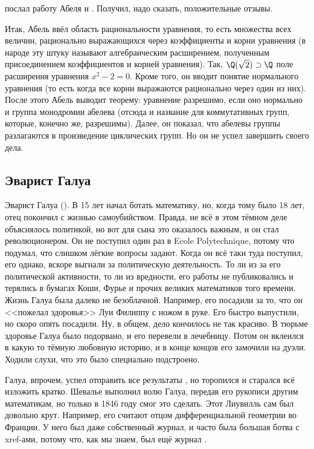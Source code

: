 \documentclass[a4paper,oneside,fleqn,10pt]{article}
\begin{document}
 послал работу Абеля  и .
Получил, надо сказать, положительные отзывы.

Итак, Абель ввёл область рациональности уравнения, то есть множества всех величин, рационально
выражающихся через коэффициенты и корни уравнения (в народе эту штуку называют алгебраическим
расширением, полученным присоединением коэффициентов и корней уравнения).
Так, $\Q(\sqrt2) \supset \Q$ поле расширения уравнения $x^2 -2=0$.
Кроме того, он вводит понятие нормального уравнения (то есть когда все корни выражаются
рационально через один из них). После этого Абель выводит теорему:
уравнение разрешимо, если оно нормально и группа монодромии абелева (отсюда и название
для коммутативных групп, которые, конечно же, разрешимы).
Далее, он показал, что абелевы группы разлагаются в произведение циклических групп.
Но он не успел завершить своего дела.

\subsection{Эварист Галуа}

Эварист Галуа (). В 15 лет начал ботать математику, но, когда тому было 18 лет, отец покончил с жизнью
самоубийством. Правда, не всё в этом тёмном деле объяснялось политикой,
но вот для сына это оказалось важным, и он стал революционером.
Он не поступил один раз в Ecole Polytechnique, потому что подумал, что слишком лёгкие вопросы
задают. Когда он всё таки туда поступил, его однако, вскоре выгнали за политическую деятельность.
То ли из за его политической активности, то ли из вредности, его работы не публиковались
и терялись в бумагах Коши, Фурье и прочих великих математиков того времени.
Жизнь Галуа была далеко не безоблачной. Например, его посадили за то, что он <<пожелал здоровья>>
Луи Филиппу с ножом в руке. Его быстро выпустили, но скоро опять посадили.
Ну, в общем, дело кончилось не так красиво. В тюрьме здоровье Галуа было подорвано,
и его перевели в лечебницу. Потом он вклеился в какую то тёмную любовную историю,
и в конце концов его замочили на дуэли. Ходили слухи, что это было специально подстроено.

Галуа, впрочем, успел отправить все результаты , но торопился и старался всё изложить
кратко. Шевалье выполнил волю Галуа, передав его рукописи другим математикам,
но только в 1846 году 
смог это сделать. Этот Лиувилль сам был довольно крут. Например, его считают отцом дифференциальной геометрии
во Франции. У него был даже собственный журнал, и часто была большая ботва с xref-ами,
потому что, как мы знаем, был ещё журнал .
\end{document}
